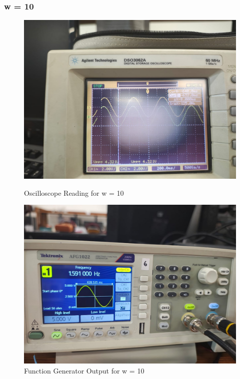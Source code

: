 \documentclass[a4paper,12pt]{article}
\begin{document}
\subsubsection{w = 10}
\begin{figure}[H]
    \centering
    \begin{minipage}{0.48\textwidth}
        \centering
        \includegraphics[width=\textwidth]{fig/1w10o.jpeg} %
        \caption{Oscilloscope Reading for w = 10}
    \end{minipage}
    \hfill
    \begin{minipage}{0.48\textwidth}
        \centering
        \includegraphics[width=\textwidth]{fig/1w10.jpeg} %
        \caption{Function Generator Output for w = 10}
    \end{minipage}
\end{figure}
\end{document}
